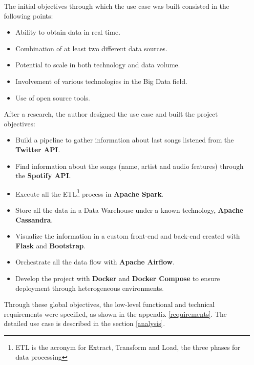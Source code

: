 
\nonzeroparskip The initial objectives through which the use case was built consisted in the following points:
\begin{itemize}
	\item Ability to obtain data in real time.
	\item Combination of at least two different data sources.
	\item Potential to scale in both technology and data volume.
	\item Involvement of various technologies in the Big Data field.
	\item Use of open source tools.
\end{itemize}

\nonzeroparskip After a research, the author designed the use case and built the project objectives:
\begin{itemize}
	\item Build a pipeline to gather information about last songs listened from the \textbf{Twitter API}.
	\item Find information about the songs (name, artist and audio features) through the \textbf{Spotify API}.
	\item Execute all the ETL\footnote{ETL is the acronym for Extract, Transform and Load, the three phases for data processing} process in \textbf{Apache Spark}.
	\item Store all the data in a Data Warehouse under a known technology, \textbf{Apache Cassandra}.
	\item Visualize the information in a custom front-end and back-end created with \textbf{Flask} and \textbf{Bootstrap}.
	\item Orchestrate all the data flow with \textbf{Apache Airflow}.
	\item Develop the project with \textbf{Docker} and \textbf{Docker Compose} to ensure deployment through heterogeneous environments.
\end{itemize}

\nonzeroparskip Through these global objectives, the low-level functional and technical requirements were specified, as shown in the appendix \ref{requirements}. The detailed use case is described in the section \ref{analysis}.